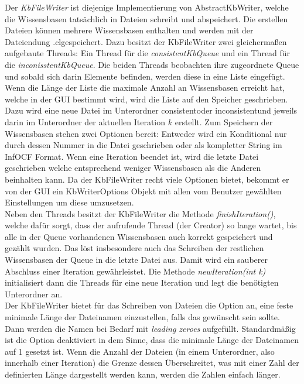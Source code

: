 \documentclass[12pt,a4paper]{article}
\begin{document}
Der \textit{KbFileWriter} ist diejenige Implementierung von AbstractKbWriter, welche die Wissensbasen tatsächlich in Dateien schreibt und abspeichert. Die erstellen Dateien können mehrere Wissensbasen enthalten und werden mit der Dateiendung \glqq .cl\grqq \space gespeichert. Dazu besitzt der KbFileWriter zwei gleichermaßen aufgebaute Threads: Ein Thread für die \textit{consistentKbQueue} und ein Thread für die \textit{inconisstentKbQueue}. Die beiden Threads beobachten ihre zugeordnete Queue und sobald sich darin Elemente befinden, werden diese in eine Liste eingefügt. Wenn die Länge der Liste die maximale Anzahl an Wissensbasen erreicht hat, welche in der GUI bestimmt wird, wird die Liste auf den Speicher geschrieben. Dazu wird eine neue  Datei im Unterordner \glqq consistent\grqq \space oder \glqq inconsistent\grqq \space  und jeweils darin im Unterordner der aktuellen Iteration $k$ erstellt. Zum Speichern der Wissensbasen stehen zwei Optionen bereit: Entweder wird ein Konditional nur durch dessen Nummer in die Datei geschrieben oder als kompletter String im InfOCF Format. Wenn eine Iteration beendet ist, wird die letzte Datei geschrieben welche entsprechend weniger Wissensbasen als die Anderen beinhalten kann. Da der KbFileWriter recht viele Optionen bietet, bekommt er von der GUI ein KbWriterOptions Objekt mit allen vom Benutzer gewählten Einstellungen um diese umzusetzen.\\
Neben den Threads besitzt der KbFileWriter die Methode \textit{finishIteration()}, welche dafür sorgt, dass der aufrufende Thread (der Creator) so lange wartet, bis alle in der Queue vorhandenen Wissensbasen auch korrekt gespeichert und gezählt wurden. Das löst insbesondere auch das Schreiben der restlichen Wissensbasen der Queue in die letzte Datei aus. Damit wird ein sauberer Abschluss einer Iteration gewährleistet. Die Methode \textit{newIteration(int k)} initialisiert dann die Threads für eine neue Iteration und legt die benötigten Unterordner an. \\
Der KbFileWriter bietet für das Schreiben von Dateien die Option an, eine feste minimale Länge der Dateinamen einzustellen, falls das gewünscht sein sollte. Dann werden die Namen bei Bedarf mit \textit{leading zeroes} aufgefüllt. Standardmäßig ist die Option deaktiviert in dem Sinne, dass die minimale Länge der Dateinamen auf 1 gesetzt ist. Wenn die Anzahl der Dateien (in einem Unterordner, also innerhalb einer Iteration) die Grenze dessen Überschreitet, was mit einer Zahl der definierten Länge dargestellt werden kann, werden die Zahlen einfach länger.
\end{document}
